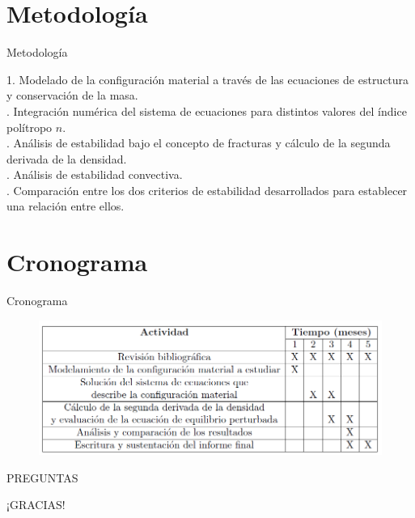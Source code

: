 \documentclass[handout,t]{beamer}
\begin{document}
\section{Metodología}
\begin{frame}{Metodología}
\justifying

1. Modelado de la configuración material a través de las ecuaciones de estructura y conservación de la masa. \\
\vspace{4mm}
. Integración numérica del sistema de ecuaciones para distintos valores del índice polítropo $n$. \\
\vspace{4mm}
. Análisis de estabilidad bajo el concepto de fracturas y cálculo de la segunda derivada de la densidad. \\
\vspace{4mm}
. Análisis de estabilidad convectiva. \\
\vspace{4mm}
. Comparación entre los dos criterios de estabilidad desarrollados para establecer una relación entre ellos.
\end{frame}


\section{Cronograma}
\begin{frame}{Cronograma}

\begin{figure}
\centering
\includegraphics[width=1\textwidth]{Cronograma.png}
\end{figure}

\end{frame}





\begin{frame}
\vspace{36mm}
\hspace{42mm}
				PREGUNTAS
\end{frame}


\begin{frame}
\vspace{36mm}
\hspace{47mm}
				¡GRACIAS!
\end{frame}
\end{document}
